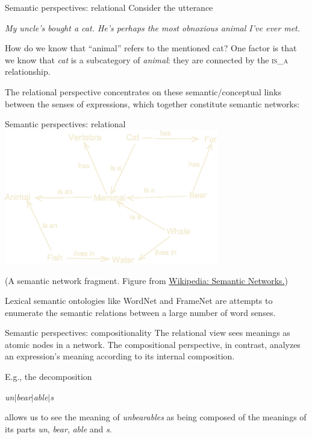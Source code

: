 \documentclass[style=upen, size=14pt]{powerdot}
\newcommand{\gold}{\color{arany}}
\begin{document}
\begin{slide}[toc=Relational semantics]{Semantic perspectives: relational}
  Consider the utterance

  \bigskip
  \emph{My uncle's bought a cat. He's perhaps the most obnoxious animal I've ever met.}
  \pause
  \bigskip

  How do we know that ``animal'' refers to the mentioned cat? One factor is
  that we know that \emph{cat} is a subcategory of \emph{animal}: they are
  connected by the \textsc{is\_a} relationship.\pause

  \bigskip

  The {\gold relational perspective} concentrates on these semantic/conceptual
  links between the senses of expressions, which together constitute semantic
  networks:
\end{slide}

\begin{slide}[toc=]{Semantic perspectives: relational}
  \includegraphics[width=0.7\textwidth]{figures/semantic_net.eps}

  
  \scriptsize{(A semantic network fragment. Figure from
    \href{https://en.wikipedia.org/wiki/Semantic_network}{Wikipedia: Semantic
      Networks.})}

  \bigskip \normalsize Lexical semantic ontologies like WordNet and FrameNet are
  attempts to enumerate the semantic relations between a large number of word
  senses.
\end{slide}

\begin{slide}[toc=Compositionality]{Semantic perspectives: compositionality}
  The relational view sees meanings as atomic nodes in a network. The {\gold
    compositional perspective}, in contrast, analyzes an expression's meaning
  according to its internal composition.\pause

  \bigskip
  
  E.g., the decomposition \bigskip

  \emph{un$\vert$bear$\vert$able$\vert$s}\pause

  \bigskip allows us to see the meaning of \emph{unbearables} as being composed of
  the meanings of its parts \emph{un}, \emph{bear}, \emph{able} and \emph{s}.
\end{slide}
\end{document}
